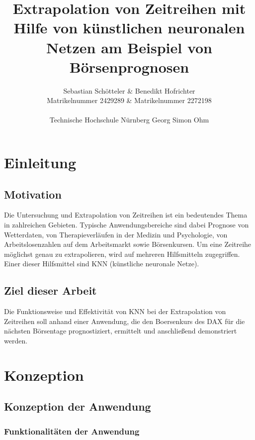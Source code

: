 \documentclass[11pt,a4paper]{scrreprt}
\begin{document}
\title
{
 {\bf Extrapolation von Zeitreihen mit Hilfe von künstlichen neuronalen Netzen am Beispiel von Börsenprognosen}
}

\author
{
	Sebastian Schötteler \& Benedikt Hofrichter \\
	Matrikelnummer 2429289 \& Matrikelnummer 2272198 \\\\ 
	Technische Hochschule Nürnberg Georg Simon Ohm \\
}


\maketitle

\tableofcontents


\chapter{Einleitung}
	\section{Motivation}
Die Untersuchung  und Extrapolation von Zeitreihen ist ein bedeutendes Thema in zahlreichen Gebieten. Typische Anwendungsbereiche sind dabei Prognose von Wetterdaten, von Therapieverläufen in der  Medizin und Psychologie, von Arbeitslosenzahlen auf dem Arbeitsmarkt sowie Börsenkursen. Um eine Zeitreihe möglichst genau zu extrapolieren, wird auf mehreren Hilfsmitteln zugegriffen. Einer dieser Hilfsmittel sind KNN (künstliche neuronale Netze).

	\section{Ziel dieser Arbeit}
Die Funktionsweise und Effektivität von KNN bei der Extrapolation von Zeitreihen soll anhand einer Anwendung, die den Boersenkurs des DAX für die nächsten Börsentage prognostiziert, ermittelt und anschließend demonstriert werden.

\chapter{Konzeption} %
	\section{Konzeption der Anwendung} %
		\subsection{Funktionalitäten der Anwendung} %
\end{document}
